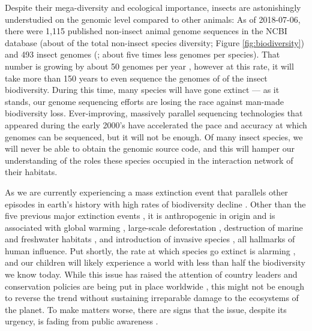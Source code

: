 Despite their mega-diversity and ecological importance, insects are
astonishingly understudied on the genomic level compared to other
animals: As of 2018-07-06, there were 1,115 published non-insect animal
genome sequences in the NCBI database \citep{OLeary2016} (about 
of the total non-insect species diversity; Figure
\ref{fig:biodiversity}) and 493 insect genomes (; about five
times less genomes per species).  That number is growing by about 50
genomes per year \citep{OLeary2016}, however at this rate, it will take
more than 150 years to even sequence the genomes of  of the insect
biodiversity.  During this time, many species will have gone extinct ---
as it stands, our genome sequencing efforts are losing the race against
man-made biodiversity loss. Ever-improving, massively parallel
sequencing technologies that appeared during the early 2000's
\citep{Behjati2013} have accelerated the pace and accuracy at which
genomes can be sequenced, but it will not be enough. Of many insect
species, we will never be able to obtain the genomic source code, and
this will hamper our understanding of the roles these species occupied
in the interaction network of their habitats.

As we are currently experiencing a mass extinction event that parallels
other episodes in earth's history with high rates of biodiversity
decline \citep{Pimm1995, Dirzo2003, Schipper2008, Barnosky2011,
Dirzo2014}. Other than the five previous major extinction events
\citep{Kolbert2014}, it is anthropogenic in origin \citep{Leakey1996,
Ceballos2015} and is associated with global warming \citep{Cook2016,
Wuebbles2017}, large-scale deforestation \citep{Wright2005}, destruction
of marine and freshwater habitats \citep{Burkhead2012}, and introduction
of invasive species \citep{Mooney2001}, all hallmarks of human
influence. Put shortly, the rate at which species go extinct is alarming
\citep{Newbold2016, Ceballos2017, Hallmann2017}, and our children will
likely experience a world with less than half the biodiversity we know
today. While this issue has raised the attention of country leaders and
conservation policies are being put in place worldwide
\citep{Puntaru2017}, this might not be enough to reverse the trend
without sustaining irreparable damage to the ecosystems of the planet.
To make matters worse, there are signs that the issue, despite its
urgency, is fading from public awareness \citep{Kusmanoff2017}. 

